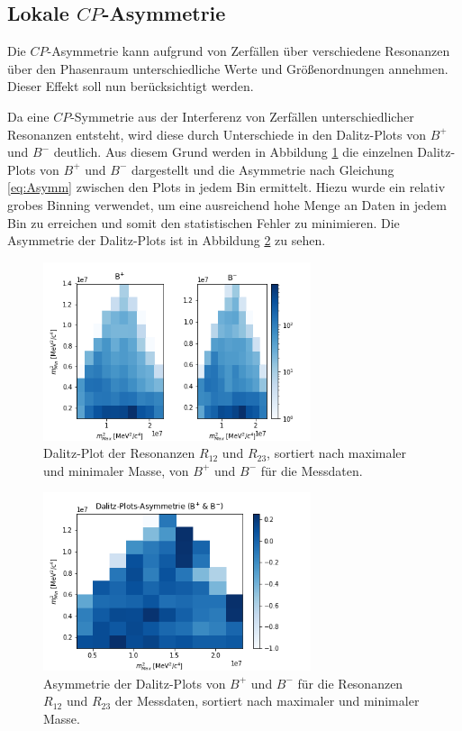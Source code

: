 \FloatBarrier

\subsection{Lokale $CP$-Asymmetrie}
Die $CP$-Asymmetrie kann aufgrund von Zerfällen über verschiedene Resonanzen über den Phasenraum unterschiedliche Werte und Größenordnungen annehmen. Dieser Effekt soll nun berücksichtigt werden.

Da eine $CP$-Symmetrie aus der Interferenz von Zerfällen unterschiedlicher Resonanzen entsteht, wird diese durch Unterschiede in den Dalitz-Plots von $B^{+}$ und $B^{-}$ deutlich. Aus diesem Grund werden in Abbildung \ref{fig:DalitzPM} die einzelnen Dalitz-Plots von $B^{+}$ und $B^{-}$ dargestellt und die Asymmetrie nach Gleichung \eqref{eq:Asymm} zwischen den Plots in jedem Bin ermittelt. Hiezu wurde ein relativ grobes Binning verwendet, um eine ausreichend hohe Menge an Daten in jedem Bin zu erreichen und somit den statistischen Fehler zu minimieren. Die Asymmetrie der Dalitz-Plots ist in Abbildung \ref{fig:DalitzDiff} zu sehen.
\begin{figure}
  \centering
  \includegraphics[width=0.7\textwidth]{plots/Bp_Bm_Dalitz.png}
  \caption{Dalitz-Plot der Resonanzen $R_{12}$ und $R_{23}$, sortiert nach maximaler und minimaler Masse, von $B^{+}$ und $B^{-}$ für die Messdaten.}
  \label{fig:DalitzPM}
\end{figure} 
\FloatBarrier
\begin{figure}
  \centering
  \includegraphics[width=0.7\textwidth]{plots/Asymm_Dalitz.png}
  \caption{Asymmetrie der Dalitz-Plots von $B^{+}$ und $B^{-}$ für die Resonanzen $R_{12}$ und $R_{23}$ der Messdaten, sortiert nach maximaler und minimaler Masse.}
  \label{fig:DalitzDiff}
\end{figure} 
